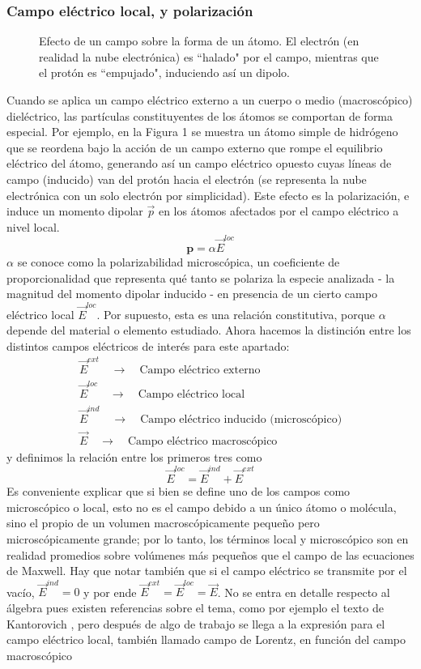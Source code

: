 \documentclass[12pt, notitlepage]{article}
\numberwithin{equation}{section}
\begin{document}
\subsubsection{Campo eléctrico local, y polarización}
\begin{figure}[H]
\centering

\caption{Efecto de un campo sobre la forma de un átomo. El electrón (en realidad la nube electrónica) es ``halado" por el campo, mientras que el protón es ``empujado", induciendo así un dipolo.}
\end{figure}
Cuando se aplica un campo eléctrico externo a un cuerpo o medio (macroscópico) dieléctrico, las partículas constituyentes de los átomos se comportan de forma especial. Por ejemplo, en la Figura 1 se muestra un átomo simple de hidrógeno que se reordena bajo la acción de un campo externo que rompe el equilibrio eléctrico del átomo, generando así un campo eléctrico opuesto cuyas líneas de campo (inducido) van del protón hacia el electrón (se representa la nube electrónica con un solo electrón por simplicidad). Este efecto es la polarización, e induce un momento dipolar $\vec{p}$ en los átomos afectados por el campo eléctrico a nivel local.
\begin{equation}
\mathbf{p} = \alpha\vec{E}^{loc}
\end{equation}
$\alpha$ se conoce como la polarizabilidad microscópica, un coeficiente de proporcionalidad que representa qué tanto se polariza la especie analizada - la magnitud del momento dipolar inducido - en presencia de un cierto campo eléctrico local $\vec{E}^{loc}$. Por supuesto, esta es una relación constitutiva, porque $\alpha$ depende del material o elemento estudiado. Ahora hacemos la distinción entre los distintos campos eléctricos de interés para este apartado:
\begin{gather*}
\vec{E}^{ext} \quad \longrightarrow \quad \text{Campo eléctrico externo}\\
\vec{E}^{loc} \quad \longrightarrow \quad \text{Campo eléctrico local}\\
\vec{E}^{ind} \quad \longrightarrow \quad \text{Campo eléctrico inducido (microscópico)}\\
\vec{E} \quad \longrightarrow \quad \text{Campo eléctrico macroscópico}
\end{gather*}
y definimos la relación entre los primeros tres como
\begin{equation}
\vec{E}^{loc} = \vec{E}^{ind} + \vec{E}^{ext}
\end{equation}
Es conveniente explicar que si bien se define uno de los campos como microscópico o local, esto no es el campo debido a un único átomo o molécula, sino el propio de un volumen macroscópicamente pequeño pero microscópicamente grande; por lo tanto, los términos local y microscópico son en realidad promedios sobre volúmenes más pequeños que el campo de las ecuaciones de Maxwell. Hay que notar también que si el campo eléctrico se transmite por el vacío, $\vec{E}^{ind} = 0$ y por ende $\vec{E}^{ext} = \vec{E}^{loc} = \vec{E}$. No se entra en detalle respecto al álgebra pues existen referencias sobre el tema, como por ejemplo el texto de Kantorovich \cite{Kantorovich}, pero después de algo de trabajo se llega a la expresión para el campo eléctrico local, también llamado campo de Lorentz, en función del campo macroscópico
\end{document}
